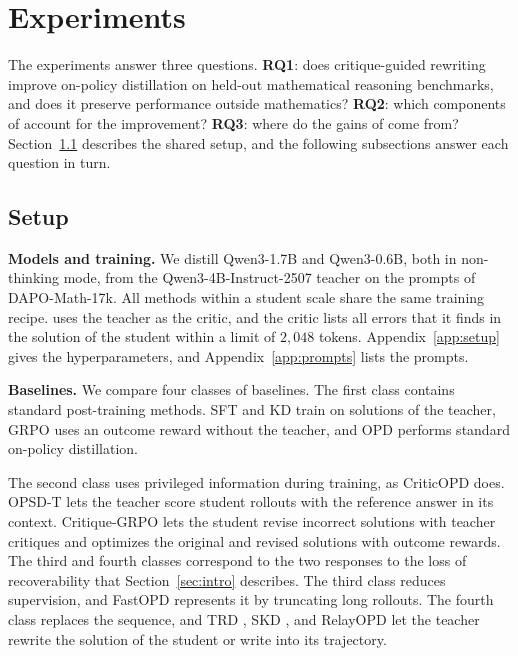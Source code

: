 \section{Experiments}
\label{sec:experiments}

The experiments answer three questions.
\textbf{RQ1}: does critique-guided rewriting improve on-policy distillation on
held-out mathematical reasoning benchmarks, and does it preserve performance
outside mathematics?
\textbf{RQ2}: which components of \ours{} account for the improvement?
\textbf{RQ3}: where do the gains of \ours{} come from?
Section~\ref{sec:experiments-setup} describes the shared setup, and the
following subsections answer each question in turn.


\subsection{Setup}
\label{sec:experiments-setup}

\noindent\textbf{Models and training.}
We distill Qwen3-1.7B and Qwen3-0.6B, both in non-thinking mode, from the
Qwen3-4B-Instruct-2507 teacher on the prompts of DAPO-Math-17k.
All methods within a student scale share the same training recipe.
\ours{} uses the teacher as the critic, and the critic lists all errors that it
finds in the solution of the student within a limit of $2{,}048$ tokens.
Appendix~\ref{app:setup} gives the hyperparameters, and
Appendix~\ref{app:prompts} lists the prompts.

\noindent\textbf{Baselines.}
We compare four classes of baselines.
The first class contains standard post-training methods.
SFT and KD train on solutions of the teacher, GRPO uses an outcome
reward without the teacher, and OPD performs standard on-policy distillation.

The second class uses privileged information during
training, as CriticOPD does. OPSD-T
\citep{zhao2026selfdistilled} lets the teacher score
student rollouts with the reference answer in its
context. Critique-GRPO \citep{zhang2026critiquegrpo}
lets the student revise incorrect solutions with
teacher critiques and optimizes the original and
revised solutions with outcome rewards.
The third and fourth classes correspond to the two responses to the loss of
recoverability that Section~\ref{sec:intro} describes.
The third class reduces supervision, and FastOPD \citep{zhang2026fast}
represents it by truncating long rollouts.
The fourth class replaces the sequence, and TRD \citep{jiang2026trajectory},
SKD \citep{xu2025speculative}, and RelayOPD \citep{xu2026relay} let the teacher
rewrite the solution of the student or write into its trajectory.

